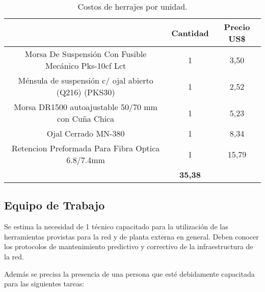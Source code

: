 \begin{table}[H]
  \centering
    \begin{tabular}{|cc|c|}
    \hline
    \rowcolor[rgb]{ .773,  .851,  .945} \multicolumn{1}{|c|}{\textbf{Articulo}} & \textbf{Cantidad} & \textbf{Precio US\$} \bigstrut\\
    \hline
    \multicolumn{1}{|c|}{Morsa De Suspensión Con Fusible Mecánico Pks-10cf Lct} & 1     & 3,50 \bigstrut\\
    \hline
    \multicolumn{1}{|c|}{Ménsula de suspensión c/ ojal abierto (Q216) (PKS30) } & 1     & 2,52 \bigstrut\\
    \hline
    \multicolumn{1}{|c|}{Morsa DR1500 autoajustable 50/70 mm con Cuña Chica} & 1     & 5,23 \bigstrut\\
    \hline
    \multicolumn{1}{|c|}{Ojal Cerrado MN-380} & 1     & 8,34 \bigstrut\\
    \hline
    \multicolumn{1}{|c|}{Retencion Preformada Para Fibra Optica 6.8/7.4mm} & 1     & 15,79 \bigstrut\\
    \hline
    \rowcolor[rgb]{ .773,  .851,  .945} \multicolumn{2}{|c|}{\textbf{Total}} & \textbf{35,38} \bigstrut\\
    \hline
    \end{tabular}%
	\caption{Costos de herrajes por unidad.}
  \label{tab:costos-herr}%
\end{table}%



\subsection{Equipo de Trabajo}


Se estima la necesidad de 1 técnico capacitado para la utilización de las herramientas provistas para la red y de planta externa en general. Deben conocer los protocolos de mantenimiento predictivo y correctivo de la infraestructura de la red. 


Además se precisa la presencia de una persona que esté debidamente capacitada para las siguientes tareas:

